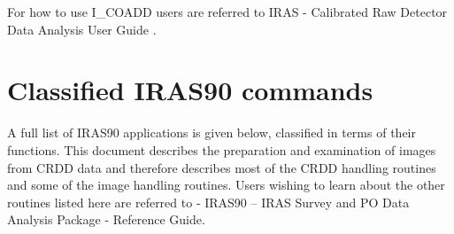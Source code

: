 For how to use I\_COADD users are referred to IRAS - Calibrated Raw Detector
Data Analysis User Guide .
 
\section{Classified IRAS90 commands
\label{m:otheriras90}}

A full list of {\small IRAS90} applications is given below, classified in terms
of their functions. This document describes the preparation and examination
of images from CRDD data and therefore describes most of the CRDD handling
routines and some of the image handling routines. Users wishing to learn about
the other routines listed here are referred to 
 - IRAS90 -- IRAS Survey
and PO Data Analysis Package - Reference Guide.

